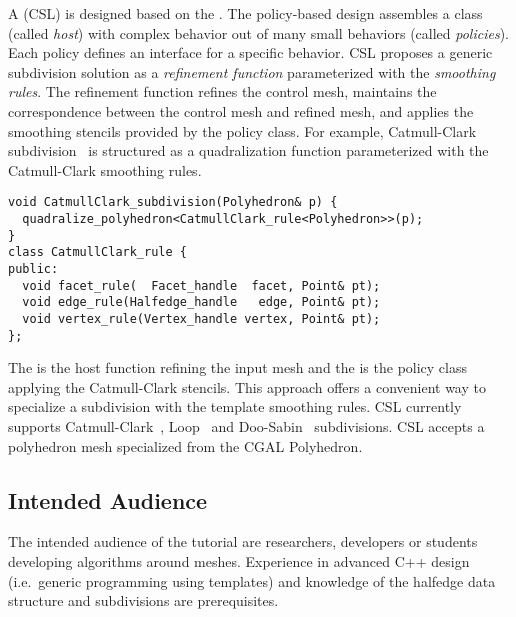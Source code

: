 \documentclass[letter,twocolumn]{article}
\begin{document}
A  (CSL) is designed
based on the  \cite{Alexandrescu:2001:MCD}.
The policy-based design assembles a class
(called \emph{host}) with complex behavior out of many 
small behaviors (called \emph{policies}).
Each policy defines an interface for a
specific behavior. CSL proposes a 
generic subdivision solution as a \emph{refinement function\/}
parameterized with the \emph{smoothing rules}.
The refinement function refines the control mesh,
maintains the correspondence between the control mesh and refined
mesh, and applies the smoothing stencils provided by the policy
class. For example, Catmull-Clark subdivision~\cite{cc} is structured
as a quadralization function parameterized with the Catmull-Clark
smoothing rules.
\begin{lstlisting}
void CatmullClark_subdivision(Polyhedron& p) {    
  quadralize_polyhedron<CatmullClark_rule<Polyhedron>>(p);  
}
class CatmullClark_rule {
public:
  void facet_rule(  Facet_handle  facet, Point& pt);
  void edge_rule(Halfedge_handle   edge, Point& pt);
  void vertex_rule(Vertex_handle vertex, Point& pt);
};
\end{lstlisting}

\noindent The  
is the host function refining the input mesh
and the  is the policy 
class applying the Catmull-Clark stencils.
This approach offers a convenient way to
specialize a subdivision with the template smoothing rules.
CSL currently supports Catmull-Clark~\cite{cc}, 
Loop~\cite{loop} and Doo-Sabin~\cite{ds} subdivisions.
CSL accepts a polyhedron mesh specialized from the
CGAL Polyhedron. 

\subsection*{Intended Audience}

The intended audience of the tutorial are researchers, developers or
students developing algorithms around meshes. Experience in advanced
C++ design (i.e.\ generic programming using templates) and knowledge
of the halfedge data structure and subdivisions are prerequisites.

{\footnotesize


}
\end{document}
